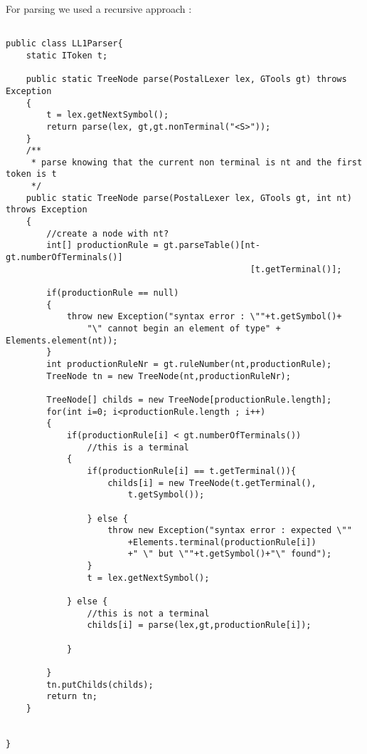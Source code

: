 \documentclass{eplDoc}
\begin{document}
For parsing we used a recursive approach : 
\begin{lstlisting}
    
public class LL1Parser{
	static IToken t;

	public static TreeNode parse(PostalLexer lex, GTools gt) throws Exception
	{ 
		t = lex.getNextSymbol();
		return parse(lex, gt,gt.nonTerminal("<S>"));
	}
	/**
	 * parse knowing that the current non terminal is nt and the first token is t
	 */
	public static TreeNode parse(PostalLexer lex, GTools gt, int nt) throws Exception
	{ 
		//create a node with nt?
		int[] productionRule = gt.parseTable()[nt-gt.numberOfTerminals()]
                                                [t.getTerminal()];
		
		if(productionRule == null)
		{
			throw new Exception("syntax error : \""+t.getSymbol()+
                "\" cannot begin an element of type" + Elements.element(nt));
		}
		int productionRuleNr = gt.ruleNumber(nt,productionRule);
		TreeNode tn = new TreeNode(nt,productionRuleNr);
		
		TreeNode[] childs = new TreeNode[productionRule.length];
		for(int i=0; i<productionRule.length ; i++)
		{
			if(productionRule[i] < gt.numberOfTerminals())
				//this is a terminal
			{
				if(productionRule[i] == t.getTerminal()){
					childs[i] = new TreeNode(t.getTerminal(),
                        t.getSymbol());

				} else {
					throw new Exception("syntax error : expected \""
                        +Elements.terminal(productionRule[i]) 
                        +" \" but \""+t.getSymbol()+"\" found");
				}
				t = lex.getNextSymbol();

			} else {
				//this is not a terminal
				childs[i] = parse(lex,gt,productionRule[i]);
				
			}
			
		}
		tn.putChilds(childs);
		return tn;
	}
	
    
}
\end{lstlisting}
\end{document}

